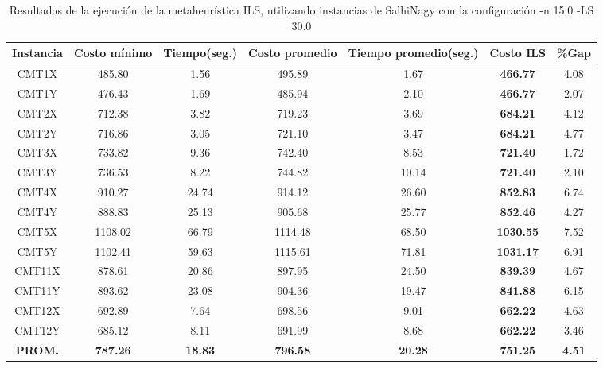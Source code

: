 \begin{table}[ht]
\caption{Resultados de la ejecución de la metaheurística ILS, utilizando instancias de SalhiNagy con la configuración -n 15.0 -LS 30.0}
\centering
\small
\begin{tabular}{c c c c c c c}
\hline\hline
Instancia & Costo mínimo & Tiempo(seg.) & Costo promedio & Tiempo promedio(seg.) & Costo ILS & \%Gap \\ [0.5ex]
\hline
CMT1X & 485.80 & 1.56 & 
495.89 & 1.67 & \bf{466.77} & 
4.08\\CMT1Y & 476.43 & 1.69 & 
485.94 & 2.10 & \bf{466.77} & 
2.07\\CMT2X & 712.38 & 3.82 & 
719.23 & 3.69 & \bf{684.21} & 
4.12\\CMT2Y & 716.86 & 3.05 & 
721.10 & 3.47 & \bf{684.21} & 
4.77\\CMT3X & 733.82 & 9.36 & 
742.40 & 8.53 & \bf{721.40} & 
1.72\\CMT3Y & 736.53 & 8.22 & 
744.82 & 10.14 & \bf{721.40} & 
2.10\\CMT4X & 910.27 & 24.74 & 
914.12 & 26.60 & \bf{852.83} & 
6.74\\CMT4Y & 888.83 & 25.13 & 
905.68 & 25.77 & \bf{852.46} & 
4.27\\CMT5X & 1108.02 & 66.79 & 
1114.48 & 68.50 & \bf{1030.55} & 
7.52\\CMT5Y & 1102.41 & 59.63 & 
1115.61 & 71.81 & \bf{1031.17} & 
6.91\\CMT11X & 878.61 & 20.86 & 
897.95 & 24.50 & \bf{839.39} & 
4.67\\CMT11Y & 893.62 & 23.08 & 
904.36 & 19.47 & \bf{841.88} & 
6.15\\CMT12X & 692.89 & 7.64 & 
698.56 & 9.01 & \bf{662.22} & 
4.63\\CMT12Y & 685.12 & 8.11 & 
691.99 & 8.68 & \bf{662.22} & 
3.46\\\bf{PROM.} & 
\bf{787.26} & \bf{18.83} & \bf{796.58} & \bf{20.28} & \bf{751.25} & \bf{4.51}\\[1ex]\hline
\end{tabular}
\label{table:nonlin}
\end{table} \clearpage
